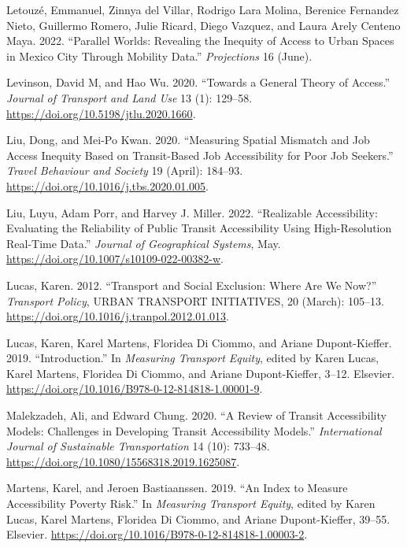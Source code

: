 \documentclass{article}
\newlength{\cslhangindent}
\newenvironment{CSLReferences}[2] %
 {\begin{list}{}{%
  \setlength{\itemindent}{0pt}
  \setlength{\leftmargin}{0pt}
  \setlength{\parsep}{0pt}
  \ifodd #1
   \setlength{\leftmargin}{\cslhangindent}
   \setlength{\itemindent}{-1\cslhangindent}
  \fi
  \setlength{\itemsep}{#2\baselineskip}}}
 {\end{list}}
\begin{document}
\begin{CSLReferences}{1}{0}
Letouzé, Emmanuel, Zinnya del Villar, Rodrigo Lara Molina, Berenice
Fernandez Nieto, Guillermo Romero, Julie Ricard, Diego Vazquez, and
Laura Arely Centeno Maya. 2022. {``Parallel {Worlds}: {Revealing} the
{Inequity} of {Access} to {Urban Spaces} in {Mexico City Through
Mobility Data}.''} \emph{Projections} 16 (June).

Levinson, David M, and Hao Wu. 2020. {``Towards a General Theory of
Access.''} \emph{Journal of Transport and Land Use} 13 (1): 129--58.
\url{https://doi.org/10.5198/jtlu.2020.1660}.

Liu, Dong, and Mei-Po Kwan. 2020. {``Measuring Spatial Mismatch and Job
Access Inequity Based on Transit-Based Job Accessibility for Poor Job
Seekers.''} \emph{Travel Behaviour and Society} 19 (April): 184--93.
\url{https://doi.org/10.1016/j.tbs.2020.01.005}.

Liu, Luyu, Adam Porr, and Harvey J. Miller. 2022. {``Realizable
Accessibility: Evaluating the Reliability of Public Transit
Accessibility Using High-Resolution Real-Time Data.''} \emph{Journal of
Geographical Systems}, May.
\url{https://doi.org/10.1007/s10109-022-00382-w}.

Lucas, Karen. 2012. {``Transport and Social Exclusion: {Where} Are We
Now?''} \emph{Transport Policy}, {URBAN TRANSPORT INITIATIVES}, 20
(March): 105--13. \url{https://doi.org/10.1016/j.tranpol.2012.01.013}.

Lucas, Karen, Karel Martens, Floridea Di Ciommo, and Ariane
Dupont-Kieffer. 2019. {``Introduction.''} In \emph{Measuring {Transport
Equity}}, edited by Karen Lucas, Karel Martens, Floridea Di Ciommo, and
Ariane Dupont-Kieffer, 3--12. Elsevier.
\url{https://doi.org/10.1016/B978-0-12-814818-1.00001-9}.

Malekzadeh, Ali, and Edward Chung. 2020. {``A Review of Transit
Accessibility Models: {Challenges} in Developing Transit Accessibility
Models.''} \emph{International Journal of Sustainable Transportation} 14
(10): 733--48. \url{https://doi.org/10.1080/15568318.2019.1625087}.

Martens, Karel, and Jeroen Bastiaanssen. 2019. {``An Index to Measure
Accessibility Poverty Risk.''} In \emph{Measuring {Transport Equity}},
edited by Karen Lucas, Karel Martens, Floridea Di Ciommo, and Ariane
Dupont-Kieffer, 39--55. Elsevier.
\url{https://doi.org/10.1016/B978-0-12-814818-1.00003-2}.


\end{CSLReferences}
\end{document}
